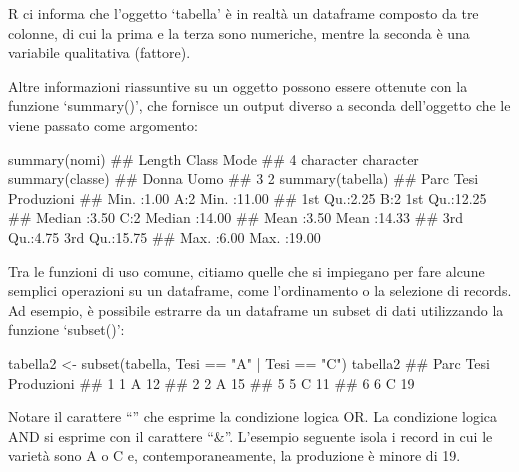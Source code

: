 \documentclass[a4paper,12pt,oneside]{book}
\newenvironment{Shaded}{\begin{snugshade}}{\end{snugshade}}
\newcommand{\SpecialCharTok}[1]{#1}
\newcommand{\StringTok}[1]{#1}
\newcommand{\DocumentationTok}[1]{#1}
\newcommand{\OtherTok}[1]{#1}
\newcommand{\FunctionTok}[1]{#1}
\newcommand{\NormalTok}[1]{#1}
\begin{document}
R ci informa che l'oggetto `tabella' è in realtà un dataframe composto da tre colonne, di cui la prima e la terza sono numeriche, mentre la seconda è una variabile qualitativa (fattore).

Altre informazioni riassuntive su un oggetto possono essere ottenute con la funzione `summary()', che fornisce un output diverso a seconda dell'oggetto che le viene passato come argomento:

\begin{Shaded}
\begin{Highlighting}[]
\FunctionTok{summary}\NormalTok{(nomi)}
\DocumentationTok{\#\#    Length     Class      Mode }
\DocumentationTok{\#\#         4 character character}
\FunctionTok{summary}\NormalTok{(classe)}
\DocumentationTok{\#\# Donna  Uomo }
\DocumentationTok{\#\#     3     2}
\FunctionTok{summary}\NormalTok{(tabella)}
\DocumentationTok{\#\#       Parc      Tesi    Produzioni   }
\DocumentationTok{\#\#  Min.   :1.00   A:2   Min.   :11.00  }
\DocumentationTok{\#\#  1st Qu.:2.25   B:2   1st Qu.:12.25  }
\DocumentationTok{\#\#  Median :3.50   C:2   Median :14.00  }
\DocumentationTok{\#\#  Mean   :3.50         Mean   :14.33  }
\DocumentationTok{\#\#  3rd Qu.:4.75         3rd Qu.:15.75  }
\DocumentationTok{\#\#  Max.   :6.00         Max.   :19.00}
\end{Highlighting}
\end{Shaded}

Tra le funzioni di uso comune, citiamo quelle che si impiegano per fare alcune semplici operazioni su un dataframe, come l'ordinamento o la selezione di records. Ad esempio, è possibile estrarre da un dataframe un subset di dati utilizzando la funzione `subset()':

\begin{Shaded}
\begin{Highlighting}[]
\NormalTok{tabella2  }\OtherTok{\textless{}{-}}  \FunctionTok{subset}\NormalTok{(tabella, Tesi }\SpecialCharTok{==} \StringTok{"A"} \SpecialCharTok{|}\NormalTok{ Tesi }\SpecialCharTok{==} \StringTok{"C"}\NormalTok{)}
\NormalTok{tabella2}
\DocumentationTok{\#\#   Parc Tesi Produzioni}
\DocumentationTok{\#\# 1    1    A         12}
\DocumentationTok{\#\# 2    2    A         15}
\DocumentationTok{\#\# 5    5    C         11}
\DocumentationTok{\#\# 6    6    C         19}
\end{Highlighting}
\end{Shaded}

Notare il carattere ``\textbar{}'' che esprime la condizione logica OR. La condizione logica AND si esprime con il carattere ``\&''. L'esempio seguente isola i record in cui le varietà sono A o C e, contemporaneamente, la produzione è minore di 19.
\end{document}
